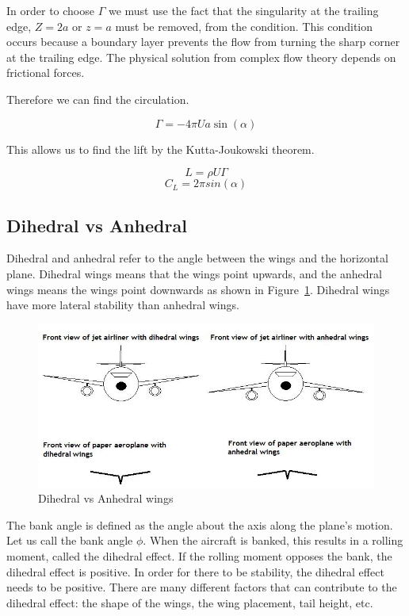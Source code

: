 In order to choose $\Gamma$ we must use the fact that the singularity at the trailing edge, 
$Z=2a$ or $z=a$ must be removed, from the condition. This condition occurs because 
a boundary layer prevents the flow from turning the sharp corner at the trailing edge.
The physical solution from complex flow theory depends on frictional forces.

Therefore we can find the circulation.

\[ \Gamma = -4\pi Ua \sin(\alpha) \]

This allows us to find the lift by the Kutta-Joukowski theorem.

\[L = \rho U \Gamma\]
\begin{equation}
\label{eq:flat_plat_cl}
C_L = 2\pi sin(\alpha)
\end{equation}

\subsection{Dihedral vs Anhedral}

Dihedral and anhedral refer to the angle between the wings and the horizontal plane.
Dihedral wings means that the wings point upwards, and the anhedral wings means the wings point
downwards as shown in Figure~\ref{fig:dihedraleffect}. Dihedral wings have more lateral 
stability than anhedral wings.

\begin{figure}[hl]
  \centering
    \includegraphics[scale=.5]{figures/dihedraleffect.png}
    \caption{Dihedral vs Anhedral wings}
  \label{fig:dihedraleffect}
\end{figure}

The bank angle is defined as the angle about the axis along
the plane's motion. Let us call the bank angle $\phi$. When the aircraft is
banked, this results in a rolling moment, called the dihedral effect. If the
rolling moment opposes the bank, the dihedral effect is positive. In order for
there to be stability, the dihedral effect needs to be positive. There are many
different factors that can contribute to the dihedral effect: the shape of the wings,
the wing placement, tail height, etc. 

